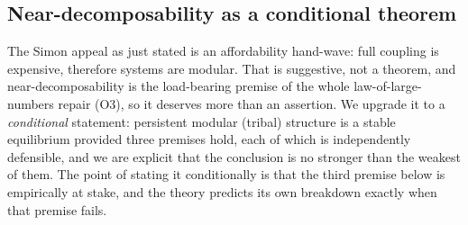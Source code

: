 \documentclass[11pt]{article}
\begin{document}
\subsection{Near-decomposability as a conditional theorem}
\label{sec:nearcond}

The Simon appeal as just stated is an affordability hand-wave: full coupling is expensive, therefore systems are modular. That is suggestive, not a theorem, and near-decomposability is the load-bearing premise of the whole law-of-large-numbers repair (O3), so it deserves more than an assertion. We upgrade it to a \emph{conditional} statement: persistent modular (tribal) structure is a stable equilibrium provided three premises hold, each of which is independently defensible, and we are explicit that the conclusion is no stronger than the weakest of them. The point of stating it conditionally is that the third premise below is empirically at stake, and the theory predicts its own breakdown exactly when that premise fails.
\end{document}
